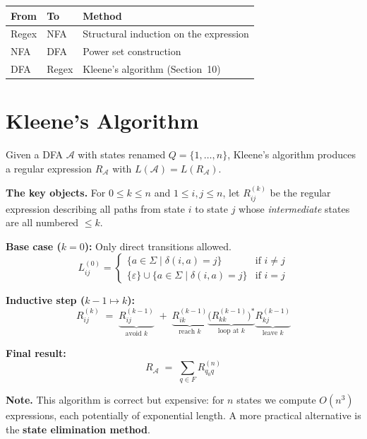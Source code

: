 \documentclass[11pt, a4paper]{article}
\theoremstyle{definition}
\theoremstyle{remark}
\newcommand{\dfa}{\mathcal{A}}
\begin{document}
\begin{center}
\begin{tabular}{lll}
  \toprule
  From  & To    & Method \\
  \midrule
  Regex & NFA   & Structural induction on the expression \\
  NFA   & DFA   & Power set construction \\
  DFA   & Regex & Kleene's algorithm (Section~10) \\
  \bottomrule
\end{tabular}
\end{center}

\section{Kleene's Algorithm}

Given a DFA $\dfa$ with states renamed $Q=\{1,\ldots,n\}$, Kleene's algorithm produces a
regular expression $R_\dfa$ with $L(\dfa)=L(R_\dfa)$.

\begin{defbox}
\textbf{The key objects.}  For $0\leq k\leq n$ and $1\leq i,j\leq n$, let $R^{(k)}_{ij}$
be the regular expression describing all paths from state $i$ to state $j$ whose
\emph{intermediate} states are all numbered $\leq k$.

\medskip
\textbf{Base case ($k=0$):}  Only direct transitions allowed.
\[
  L^{(0)}_{ij}=
  \begin{cases}
    \{a\in\Sigma\mid\delta(i,a)=j\}
        & \text{if }i\neq j \\
    \{\varepsilon\}\cup\{a\in\Sigma\mid\delta(i,a)=j\}
        & \text{if }i=j
  \end{cases}
\]

\textbf{Inductive step ($k-1\mapsto k$):}
\[
  R^{(k)}_{ij}
  \;=\;
  \underbrace{R^{(k-1)}_{ij}}_{\text{avoid }k}
  \;+\;
  \underbrace{R^{(k-1)}_{ik}}_{\text{reach }k}
  \underbrace{\bigl(R^{(k-1)}_{kk}\bigr)^*}_{\text{loop at }k}
  \underbrace{R^{(k-1)}_{kj}}_{\text{leave }k}
\]

\textbf{Final result:}
\[
  R_\dfa\;=\;\sum_{q\in F}R^{(n)}_{q_0 q}
\]
\end{defbox}

\begin{insightbox}
\textbf{Note.}  This algorithm is correct but expensive: for $n$ states we compute
$O(n^3)$ expressions, each potentially of exponential length.  A more practical alternative
is the \textbf{state elimination method}.
\end{insightbox}
\end{document}
